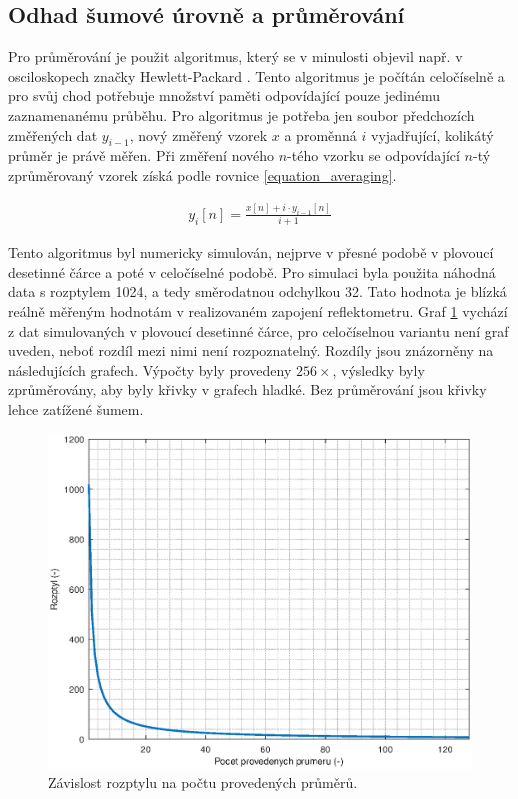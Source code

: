 \subsection{Odhad šumové úrovně a průměrování}
Pro průměrování je použit algoritmus, který se v minulosti objevil např. v osciloskopech značky Hewlett-Packard \cite{HP54100_article_journal}. Tento algoritmus je počítán celočíselně a pro svůj chod potřebuje množství paměti odpovídající pouze jedinému zaznamenanému průběhu. Pro algoritmus je potřeba jen soubor předchozích změřených dat $ y_{i-1}$, nový změřený vzorek $x$ a proměnná $i$ vyjadřující, kolikátý průměr je právě měřen. Při změření nového $n$-tého vzorku se odpovídající $n$-tý zprůměrovaný vzorek získá podle rovnice \ref{equation_averaging}.

\begin{equation}
\begin{gathered}
	y_i[n]=	\frac{x[n]+i \cdot y_{i-1}[n]}{i+1}
\end{gathered}
\label{equation_averaging}
\end{equation}

Tento algoritmus byl numericky simulován, nejprve v přesné podobě v plovoucí desetinné čárce a poté v celočíselné podobě. Pro simulaci byla použita náhodná data s rozptylem 1024, a tedy směrodatnou odchylkou 32. Tato hodnota je blízká reálně měřeným hodnotám v realizovaném zapojení reflektometru. Graf \ref{averaging_variance} vychází z dat simulovaných v plovoucí desetinné čárce, pro celočíselnou variantu není graf uveden, neboť rozdíl mezi nimi není rozpoznatelný. Rozdíly jsou znázorněny na následujících grafech. Výpočty byly provedeny $256\times$, výsledky byly zprůměrovány, aby byly křivky v grafech hladké. Bez průměrování jsou křivky lehce zatížené šumem.

\begin{figure}[htbp]
\includegraphics[width=\textwidth,keepaspectratio]{images/averaging_float_variance.eps}\caption{Závislost rozptylu na počtu provedených průměrů.}\label{averaging_variance}
\end{figure}	

